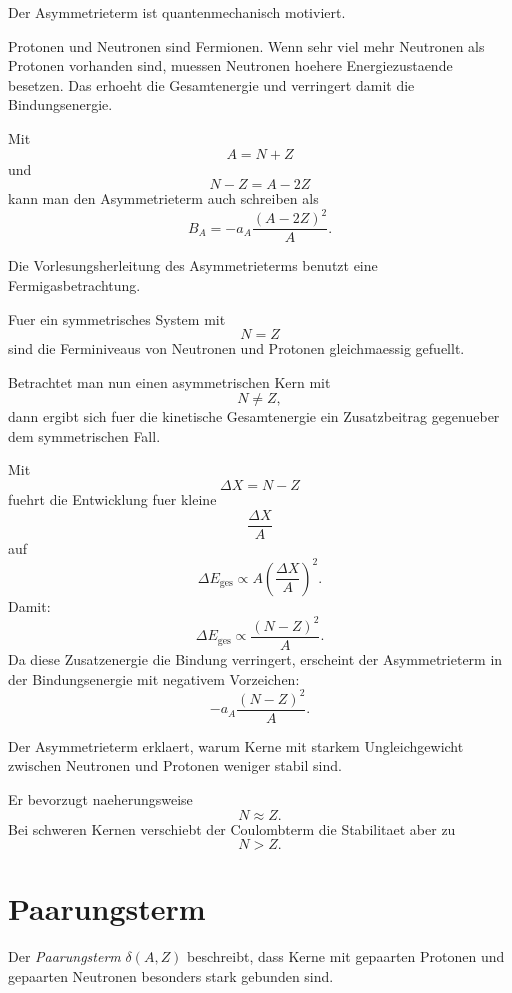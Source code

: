 \begin{conceptbox}
Der Asymmetrieterm ist quantenmechanisch motiviert.

Protonen und Neutronen sind Fermionen.
Wenn sehr viel mehr Neutronen als Protonen vorhanden sind, muessen Neutronen hoehere
Energiezustaende besetzen.
Das erhoeht die Gesamtenergie und verringert damit die Bindungsenergie.
\end{conceptbox}

\begin{formulabox}
Mit
\[
    A=N+Z
\]
und
\[
    N-Z = A-2Z
\]
kann man den Asymmetrieterm auch schreiben als
\[
    B_A
    =
    -a_A \frac{(A-2Z)^2}{A}.
\]
\end{formulabox}

\begin{derivationbox}
Die Vorlesungsherleitung des Asymmetrieterms benutzt eine Fermigasbetrachtung.

Fuer ein symmetrisches System mit
\[
    N=Z
\]
sind die Ferminiveaus von Neutronen und Protonen gleichmaessig gefuellt.

Betrachtet man nun einen asymmetrischen Kern mit
\[
    N\neq Z,
\]
dann ergibt sich fuer die kinetische Gesamtenergie ein Zusatzbeitrag gegenueber dem
symmetrischen Fall.

Mit
\[
    \Delta X = N-Z
\]
fuehrt die Entwicklung fuer kleine
\[
    \frac{\Delta X}{A}
\]
auf
\[
    \Delta E_{\mathrm{ges}}
    \propto
    A\left(\frac{\Delta X}{A}\right)^2.
\]
Damit:
\[
    \Delta E_{\mathrm{ges}}
    \propto
    \frac{(N-Z)^2}{A}.
\]
Da diese Zusatzenergie die Bindung verringert, erscheint der Asymmetrieterm in der
Bindungsenergie mit negativem Vorzeichen:
\[
    -a_A\frac{(N-Z)^2}{A}.
\]
\end{derivationbox}

\begin{examtipbox}
Der Asymmetrieterm erklaert, warum Kerne mit starkem Ungleichgewicht zwischen
Neutronen und Protonen weniger stabil sind.

Er bevorzugt naeherungsweise
\[
    N\approx Z.
\]
Bei schweren Kernen verschiebt der Coulombterm die Stabilitaet aber zu
\[
    N>Z.
\]
\end{examtipbox}

\section{Paarungsterm}

\begin{definitionbox}
Der \emph{Paarungsterm} $\delta(A,Z)$ beschreibt, dass Kerne mit gepaarten Protonen
und gepaarten Neutronen besonders stark gebunden sind.
\end{definitionbox}

